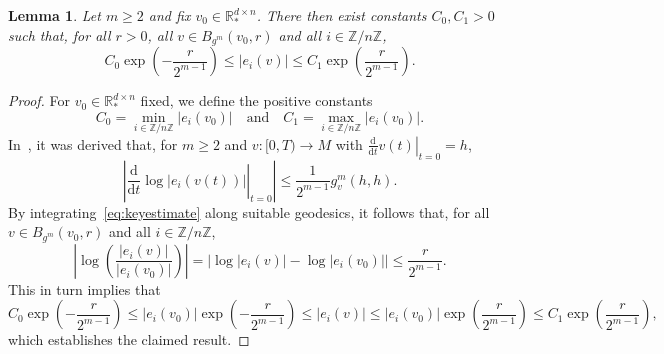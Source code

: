\documentclass[11pt]{article}
\newtheorem{lemma}[thm]{Lemma}
\newcommand{\R}{\mathbb{R}}
\newcommand{\Z}{\mathbb{Z}}
\newcommand{\db}{{\mathrm d}}
\begin{document}
\begin{lemma}\label{lem:edge_growth}
    Let $m\geq 2$ and fix $v_0\in \R^{d\times n}_*$. There then exist constants $C_0,C_1>0$ such that, for all $r>0$, all $v\in B_{g^m}(v_0,r)$ and all $i\in \Z/n\Z$,
    \begin{displaymath}
        C_0\exp\left(-\frac{r}{2^{m-1}}\right)
        \leq |e_i(v)|
        \leq C_1\exp\left(\frac{r}{2^{m-1}}\right).
    \end{displaymath}
\end{lemma}
\begin{proof}
    For $v_0\in \R^{d\times n}_*$ fixed, we define the positive constants
    \begin{displaymath}
        C_0=\min_{i\in \Z/n\Z}|e_i(v_0)|
        \quad\text{and}\quad
        C_1 = \max_{i\in \Z/n\Z}|e_i(v_0)|.
    \end{displaymath}
    In~\cite[Proof of Lemma~4.4]{cerqueira2024sobolevmetricsspacesdiscrete}, it was derived that, for $m\geq 2$ and $v\colon [0,T)\to M$ with $\left.\frac{\db}{\db t}v(t)\right|_{t=0}=h$,
    \begin{equation}\label{eq:keyestimate}
        \left|\left.\frac{\db}{\db t}\log|e_i(v(t))|\right|_{t=0}\right|
        \leq\frac{1}{2^{m-1}}g_v^m(h,h).
    \end{equation}
    By integrating~\eqref{eq:keyestimate} along suitable geodesics, it follows that, for all $v\in B_{g^m}(v_0,r)$ and all $i\in \Z/n\Z$,
    \begin{displaymath}
        \left|\log\left(\frac{|e_i(v)|}{|e_i(v_0)|}\right)\right|
        =\left|\log|e_i(v)|-\log|e_i(v_0)|\right|
        \leq \frac{r}{2^{m-1}}.
    \end{displaymath}
    This in turn implies that
    \begin{displaymath}
        C_0\exp\left(-\frac{r}{2^{m-1}}\right)
        \leq |e_i(v_0)|\exp\left(-\frac{r}{2^{m-1}}\right)
        \leq |e_i(v)|
        \leq |e_i(v_0)|\exp\left(\frac{r}{2^{m-1}}\right)
        \leq C_1\exp\left(\frac{r}{2^{m-1}}\right),
    \end{displaymath}
    which establishes the claimed result.
\end{proof}
\end{document}
